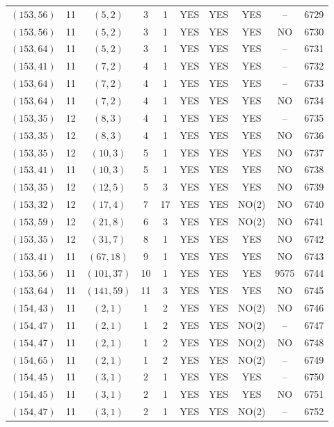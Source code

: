 \begin{longtable}{|c|c|c|c|c|c|c|c|c|c|}
$(153, 56)$ & 11 & $(5, 2)$ & 3 & 1 & YES & YES & YES & -- & 6729\\
$(153, 56)$ & 11 & $(5, 2)$ & 3 & 1 & YES & YES & YES & NO & 6730\\
$(153, 64)$ & 11 & $(5, 2)$ & 3 & 1 & YES & YES & YES & -- & 6731\\
$(153, 41)$ & 11 & $(7, 2)$ & 4 & 1 & YES & YES & YES & -- & 6732\\
$(153, 64)$ & 11 & $(7, 2)$ & 4 & 1 & YES & YES & YES & -- & 6733\\
$(153, 64)$ & 11 & $(7, 2)$ & 4 & 1 & YES & YES & YES & NO & 6734\\
$(153, 35)$ & 12 & $(8, 3)$ & 4 & 1 & YES & YES & YES & -- & 6735\\
$(153, 35)$ & 12 & $(8, 3)$ & 4 & 1 & YES & YES & YES & NO & 6736\\
$(153, 35)$ & 12 & $(10, 3)$ & 5 & 1 & YES & YES & YES & NO & 6737\\
$(153, 41)$ & 11 & $(10, 3)$ & 5 & 1 & YES & YES & YES & NO & 6738\\
$(153, 35)$ & 12 & $(12, 5)$ & 5 & 3 & YES & YES & YES & NO & 6739\\
$(153, 32)$ & 12 & $(17, 4)$ & 7 & 17 & YES & YES & NO(2) & NO & 6740\\
$(153, 59)$ & 12 & $(21, 8)$ & 6 & 3 & YES & YES & NO(2) & NO & 6741\\
$(153, 35)$ & 12 & $(31, 7)$ & 8 & 1 & YES & YES & YES & NO & 6742\\
$(153, 41)$ & 11 & $(67, 18)$ & 9 & 1 & YES & YES & YES & NO & 6743\\
$(153, 56)$ & 11 & $(101, 37)$ & 10 & 1 & YES & YES & YES & 9575 & 6744\\
$(153, 64)$ & 11 & $(141, 59)$ & 11 & 3 & YES & YES & YES & NO & 6745\\
$(154, 43)$ & 11 & $(2, 1)$ & 1 & 2 & YES & YES & NO(2) & NO & 6746\\
$(154, 47)$ & 11 & $(2, 1)$ & 1 & 2 & YES & YES & NO(2) & -- & 6747\\
$(154, 47)$ & 11 & $(2, 1)$ & 1 & 2 & YES & YES & NO(2) & NO & 6748\\
$(154, 65)$ & 11 & $(2, 1)$ & 1 & 2 & YES & YES & NO(2) & -- & 6749\\
$(154, 45)$ & 11 & $(3, 1)$ & 2 & 1 & YES & YES & YES & -- & 6750\\
$(154, 45)$ & 11 & $(3, 1)$ & 2 & 1 & YES & YES & YES & NO & 6751\\
$(154, 47)$ & 11 & $(3, 1)$ & 2 & 1 & YES & YES & NO(2) & -- & 6752\\

\end{longtable}
